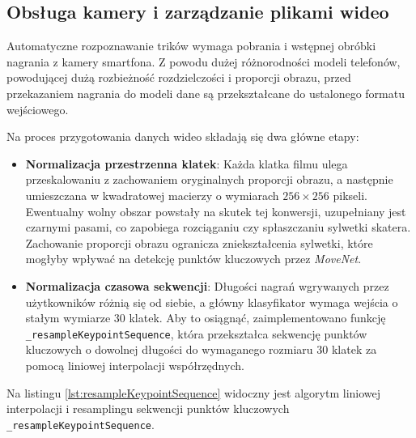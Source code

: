     \subsection{Obsługa kamery i zarządzanie plikami wideo}
    
        Automatyczne rozpoznawanie trików wymaga pobrania i wstępnej obróbki nagrania z kamery smartfona. Z powodu dużej różnorodności modeli telefonów, powodującej dużą rozbieżność rozdzielczości i proporcji obrazu, przed przekazaniem nagrania do modeli dane są przekształcane do ustalonego formatu wejściowego.

        Na proces przygotowania danych wideo składają się dwa główne etapy:
        \begin{itemize}
            \item \textbf{Normalizacja przestrzenna klatek}: Każda klatka filmu ulega przeskalowaniu z zachowaniem oryginalnych proporcji obrazu, a następnie umieszczana w kwadratowej macierzy o wymiarach $256 \times 256$ pikseli. Ewentualny wolny obszar powstały na skutek tej konwersji, uzupełniany jest czarnymi pasami, co zapobiega rozciąganiu czy spłaszczaniu sylwetki skatera. Zachowanie proporcji obrazu ogranicza zniekształcenia sylwetki, które mogłyby wpływać na detekcję punktów kluczowych przez \textit{MoveNet}.
            \item \textbf{Normalizacja czasowa sekwencji}: Długości nagrań wgrywanych przez użytkowników różnią się od siebie, a główny klasyfikator wymaga wejścia o stałym wymiarze 30 klatek. Aby to osiągnąć, zaimplementowano funkcję \texttt{\_resampleKeypointSequence}, która przekształca sekwencję punktów kluczowych o dowolnej długości do wymaganego rozmiaru 30 klatek za pomocą liniowej interpolacji współrzędnych.
        \end{itemize}

        Na listingu \ref{lst:resampleKeypointSequence} widoczny jest algorytm liniowej interpolacji i resamplingu sekwencji punktów kluczowych \texttt{\_resampleKeypointSequence}.

